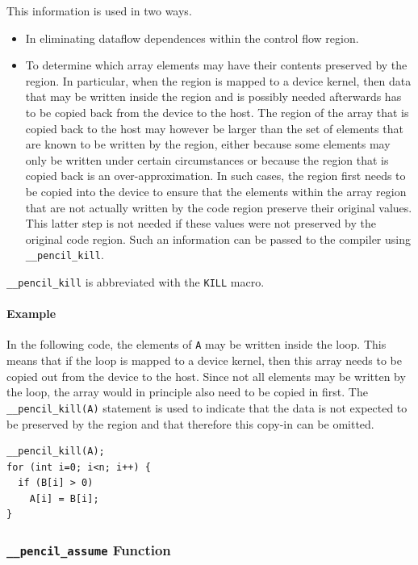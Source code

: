   This information is used in two ways.
  \begin{itemize}
   \item In eliminating dataflow dependences within the control
         flow region.
   \item To determine which array elements may have their contents
         preserved by the region.
         In particular, when the region is mapped to a device kernel, then
         data that may be written inside the region and is possibly needed
         afterwards has to be copied back from the device to the host.
         The region of the array that is copied back to the host may
         however be larger than the set of elements that are known
         to be written by the region, either because some elements
         may only be written under certain circumstances or because
         the region that is copied back is an over-approximation.
         In such cases, the region first needs to be copied into the device
         to ensure that the elements within the array region that are not
         actually written by the code region preserve their original values.
         This latter step is not needed if these values were not preserved
         by the original code region.  Such an information can be passed to
         the compiler using \lstinline!__pencil_kill!.
  \end{itemize}

  \lstinline!__pencil_kill! is abbreviated with the \lstinline!KILL! macro.

\paragraph{Example}
  In the following code, the elements of \lstinline!A!
  may be written inside the loop.  This means that if the loop
  is mapped to a device kernel, then this array needs to be copied
  out from the device to the host.  Since not all elements may be
  written by the loop, the array would in principle also need to
  be copied in first.  The \lstinline!__pencil_kill(A)! statement
  is used to indicate that the data is not expected to be preserved
  by the region and that therefore this copy-in can be omitted.

\begin{lstlisting}[language=pencil]
__pencil_kill(A);
for (int i=0; i<n; i++) {
  if (B[i] > 0)
    A[i] = B[i];
}
\end{lstlisting}

\subsubsection{\texttt{\_\_pencil\_assume} Function}


